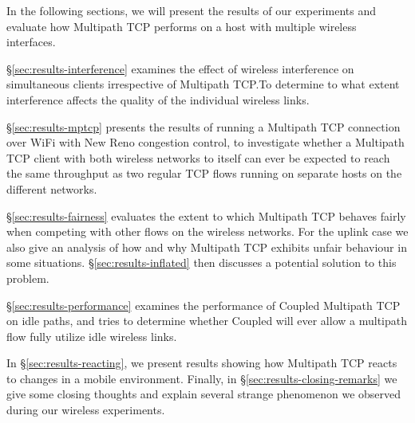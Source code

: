 In the following sections, we will present the results of our experiments and
evaluate how Multipath TCP performs on a host with multiple wireless interfaces.

\S\ref{sec:results-interference} examines the effect of wireless interference on
simultaneous clients irrespective of Multipath TCP.\@ To determine to what
extent interference affects the quality of the individual wireless links.

\S\ref{sec:results-mptcp} presents the results of running a Multipath TCP
connection over WiFi with New Reno congestion control, to investigate whether a
Multipath TCP client with both wireless networks to itself can ever be expected
to reach the same throughput as two regular TCP flows running on separate hosts
on the different networks.

\S\ref{sec:results-fairness} evaluates the extent to which Multipath TCP behaves
fairly when competing with other flows on the wireless networks. For the uplink
case we also give an analysis of how and why Multipath TCP exhibits unfair
behaviour in some situations. \S\ref{sec:results-inflated} then discusses a
potential solution to this problem.

\S\ref{sec:results-performance} examines the performance of Coupled Multipath
TCP on idle paths, and tries to determine whether Coupled will ever allow a
multipath flow fully utilize idle wireless links.

In \S\ref{sec:results-reacting}, we present results showing how Multipath TCP
reacts to changes in a mobile environment. Finally, in
\S\ref{sec:results-closing-remarks} we give some closing thoughts and explain
several strange phenomenon we observed during our wireless experiments.
